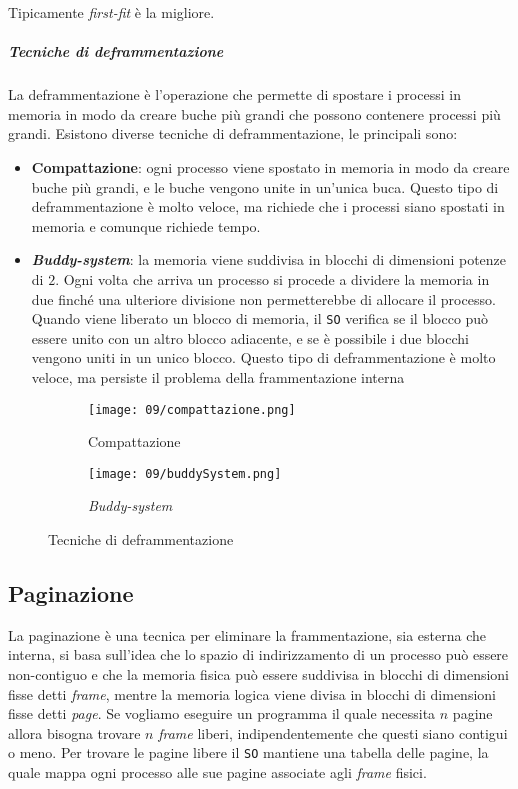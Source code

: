                 Tipicamente \textit{first-fit} è la migliore.
            \subparagraph{Tecniche di deframmentazione} 
                La deframmentazione è l'operazione che permette di spostare i processi in memoria in modo da creare buche più grandi che possono contenere processi più grandi. Esistono diverse tecniche di deframmentazione, le principali sono:
                \begin{itemize}
                    \item \textbf{Compattazione}: ogni processo viene spostato in memoria in modo da creare buche più grandi, e le buche vengono unite in un'unica buca. Questo tipo di deframmentazione è molto veloce, ma richiede che i processi siano spostati in memoria e comunque richiede tempo.
                    \item \textbf{\textit{Buddy-system}}: la memoria viene suddivisa in blocchi di dimensioni potenze di $2$. Ogni volta che arriva un processo si procede a dividere la memoria in due finché una ulteriore divisione non permetterebbe di allocare il processo. Quando viene liberato un blocco di memoria, il \texttt{SO} verifica se il blocco può essere unito con un altro blocco adiacente, e se è possibile i due blocchi vengono uniti in un unico blocco. Questo tipo di deframmentazione è molto veloce, ma persiste il problema della frammentazione interna
                \end{itemize}
                \begin{figure}[H]
                    \centering
                    \begin{subfigure}{0.45\textwidth}
                        \centering
                        \texttt{[image: 09/compattazione.png]}
                        \caption{Compattazione}
                        \label{fig:compattazione}
                    \end{subfigure}
                    \begin{subfigure}{0.45\textwidth}
                        \centering
                        \texttt{[image: 09/buddySystem.png]}
                        \caption{\textit{Buddy-system}}
                        \label{fig:buddySystem}
                    \end{subfigure}
                    \caption{Tecniche di deframmentazione}
                \end{figure}
    \subsection{Paginazione}
        La paginazione è una tecnica per eliminare la frammentazione, sia esterna che interna, si basa sull'idea che lo spazio di indirizzamento di un processo può essere non-contiguo e che la memoria fisica può essere suddivisa in blocchi di dimensioni fisse detti \textit{frame}, mentre la memoria logica viene divisa in blocchi di dimensioni fisse detti \textit{page}.\newline
        Se vogliamo eseguire un programma il quale necessita $n$ pagine allora bisogna trovare $n$ \textit{frame} liberi, indipendentemente che questi siano contigui o meno. Per trovare le pagine libere il \texttt{SO} mantiene una tabella delle pagine, la quale mappa ogni processo alle sue pagine associate agli \textit{frame} fisici.
